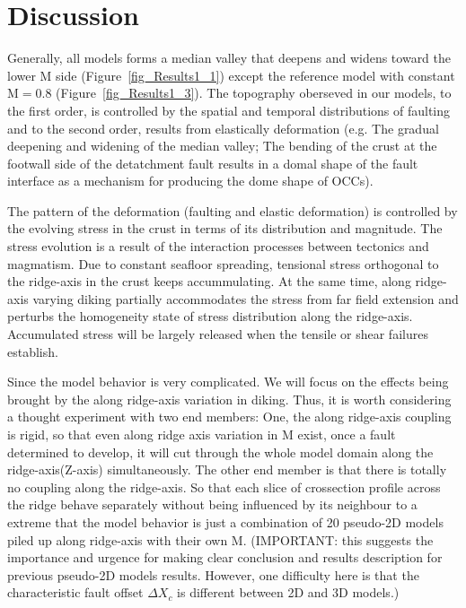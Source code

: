 \pagebreak
\section{Discussion}

Generally, all models forms a median valley that deepens and widens toward the lower M side (Figure~\hyperref[fig_Results1_1]{\ref{fig_Results1_1}}) except the reference model with constant M$=0.8$ (Figure~\hyperref[fig_Results1_3]{\ref{fig_Results1_3}}). The topography oberseved in our models, to the first order, is controlled by the spatial and temporal distributions of faulting and to the second order, results from elastically deformation (e.g. The gradual deepening and widening of the median valley; The bending of the crust at the footwall side of the detatchment fault results in a domal shape of the fault interface as a mechanism for producing the dome shape of OCCs). 

The pattern of the deformation (faulting and elastic deformation) is controlled by the evolving stress in the crust in terms of its distribution and magnitude. The stress evolution is a result of the interaction processes between tectonics and magmatism. Due to constant seafloor spreading, tensional stress orthogonal to the ridge-axis in the crust keeps accummulating. At the same time, along ridge-axis varying diking partially accommodates the stress from far field extension and perturbs the homogeneity state of stress distribution along the ridge-axis. Accumulated stress will be largely released when the tensile or shear failures establish.

Since the model behavior is very complicated. We will focus on the effects being brought by the along ridge-axis variation in diking. Thus, it is worth considering a thought experiment with two end members: One, the along ridge-axis coupling is rigid, so that even along ridge axis variation in M exist, once a fault determined to develop, it will cut through the whole model domain along the ridge-axis(Z-axis) simultaneously. The other end member is that there is totally no coupling along the ridge-axis. So that each slice of crossection profile across the ridge behave separately without being influenced by its neighbour to a extreme that the model behavior is just a combination of 20 pseudo-2D models piled up along ridge-axis with their own M. (IMPORTANT: this suggests the importance and urgence for making clear conclusion and results description for previous pseudo-2D models results. However, one difficulty here is that the characteristic fault offset $\Delta X_{c}$ is different between 2D and 3D models.)

